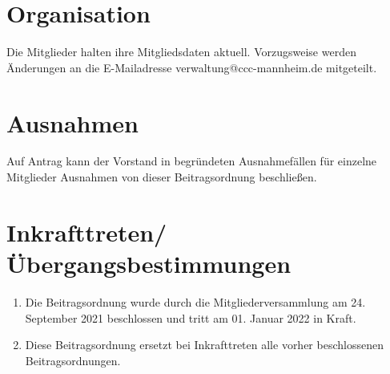 \documentclass[a4paper, 12pt]{scrartcl}
\begin{document}
\section{Organisation}
	\label{organisation}
	Die Mitglieder halten ihre Mitgliedsdaten aktuell. Vorzugsweise werden Änderungen an die E-Mailadresse verwaltung@ccc-mannheim.de mitgeteilt.

\section{Ausnahmen}
	Auf Antrag kann der Vorstand in begründeten Ausnahmefällen für einzelne Mitglieder Ausnahmen von dieser Beitragsordnung beschließen.

\section{Inkrafttreten/Übergangsbestimmungen}
	\begin{enumerate}
		\item Die Beitragsordnung wurde durch die Mitgliederversammlung am 24. September 2021 beschlossen und tritt am 01. Januar 2022 in Kraft.
		\item Diese Beitragsordnung ersetzt bei Inkrafttreten alle vorher beschlossenen Beitragsordnungen.
	\end{enumerate}
\end{document}
